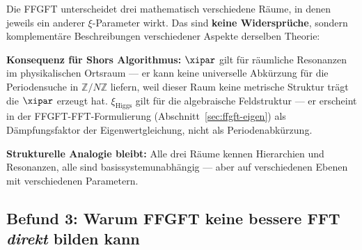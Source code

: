 \begin{foundation}
Die FFGFT unterscheidet drei mathematisch verschiedene Räume,
in denen jeweils ein anderer $\xi$-Parameter wirkt.
Das sind \textbf{keine Widersprüche}, sondern komplementäre
Beschreibungen verschiedener Aspekte derselben Theorie:

\begin{center}
\end{center}

\textbf{Konsequenz für Shors Algorithmus:}
$\xipar$ gilt für räumliche Resonanzen im physikalischen Ortsraum ---
er kann keine universelle Abkürzung für die Periodensuche in
$\mathbb{Z}/N\mathbb{Z}$ liefern, weil dieser Raum
keine metrische Struktur trägt die $\xipar$ erzeugt hat.
$\xi_\text{Higgs}$ gilt für die algebraische Feldstruktur ---
er erscheint in der FFGFT-FFT-Formulierung (Abschnitt~\ref{sec:ffgft-eigen})
als Dämpfungsfaktor der Eigenwertgleichung, nicht als Periodenabkürzung.

\textbf{Strukturelle Analogie bleibt:}
Alle drei Räume kennen Hierarchien und Resonanzen,
alle sind basissystemunabhängig ---
aber auf verschiedenen Ebenen mit verschiedenen Parametern.
\end{foundation}

\subsection{Befund 3: Warum FFGFT keine bessere FFT \emph{direkt}
  bilden kann}

